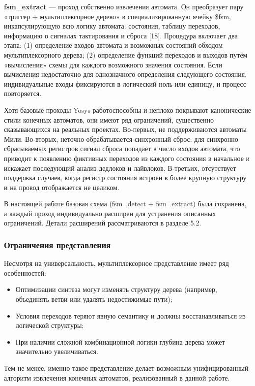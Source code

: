 \textbf{fsm\_extract} — проход собственно извлечения автомата. Он преобразует пару «триггер +
мультиплексорное дерево» в специализированную ячейку \$fsm, инкапсулирующую всю логику автомата:
состояния, таблицу переходов, информацию о сигналах тактирования и сброса [18]. Процедура включает
два этапа: (1) определение входов автомата и возможных состояний обходом мультиплексорного дерева;
(2) определение функций переходов и выходов путём «вычисления» схемы для каждого возможного
значения состояния. Если вычисления недостаточно для однозначного определения следующего состояния,
индивидуальные входы фиксируются в логический ноль или единицу, и процесс повторяется.

Хотя базовые проходы Yosys работоспособны и неплохо покрывают канонические стили конечных
автоматов, они имеют ряд ограничений, существенно сказывающихся на реальных проектах.
Во-первых, не поддерживаются автоматы Мили. Во-вторых, неточно обрабатывается синхронный сброс:
для синхронно сбрасываемых регистров сигнал сброса попадает в число входов автомата, что приводит
к появлению фиктивных переходов из каждого состояния в начальное и искажает последующий анализ
дедлоков и лайвлоков. В-третьих, отсутствует поддержка случаев, когда регистр состояния встроен
в более крупную структуру и на провод отображается не целиком.

В настоящей работе базовая схема (fsm\_detect + fsm\_extract) была сохранена, а каждый проход
индивидуально расширен для устранения описанных ограничений. Детали расширений рассматриваются
в разделе 5.2.

\subsubsection{Ограничения представления}

Несмотря на универсальность, мультиплексорное представление имеет ряд особенностей:

\begin{itemize}
\item Оптимизации синтеза могут изменять структуру дерева (например, объединять ветви или удалять
недостижимые пути);
\item Условия переходов теряют явную семантику и должны восстанавливаться из логической структуры;
\item При наличии сложной комбинационной логики глубина дерева может значительно увеличиваться.
\end{itemize}

Тем не менее, именно такое представление делает возможным унифицированный алгоритм извлечения конечных
автоматов, реализованный в данной работе.

